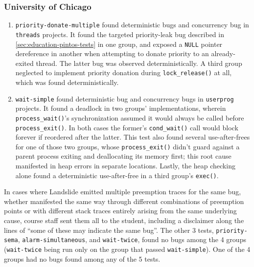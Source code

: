 \subsubsection{University of Chicago}
\label{sec:education-eval-bugs-uc}


\begin{enumerate}
	\item {\tt priority-donate-multiple} found 
		deterministic bugs and  concurrency bug in {\tt threads} projects.
		It found the targeted priority-leak bug
		described in \cref{sec:education-pintos-tests} in one group,
		and exposed a {\tt NULL} pointer dereference in another
		when attempting to donate priority to an already-exited thread.
		The latter bug was observed deterministically.
		A third group neglected to implement priority donation during {\tt lock\_release()} at all,
		which was found deterministically.
	\item {\tt wait-simple} found  deterministic bug
		and  concurrency bugs in {\tt userprog} projects.
		It found a deadlock in two groups' implementations,
		wherein {\tt process\_\allowbreak{}wait()}'s synchronization assumed
		it would always be called before {\tt process\_exit()}.
		In both cases the former's {\tt cond\_wait()} call would block forever if reordered after the latter.
		This test also found several use-after-frees for one of those two groups,
		whose {\tt process\_exit()} didn't guard against a parent process exiting and deallocating its memory first;
		this root cause manifested in heap errors in  separate locations.
		Lastly, the heap checking alone found a deterministic use-after-free in a third group's {\tt exec()}.
\end{enumerate}

In cases where Landslide emitted multiple preemption traces for the same bug,
whether manifested the same way through different combinations of preemption points
or with different stack traces entirely arising from the same underlying cause,
course staff sent them all to the student,
including a disclaimer along the lines of ``some of these may indicate the same bug''.
%
The other 3 tests, {\tt priority-sema}, {\tt alarm-simultaneous}, and {\tt wait-twice},
found no bugs among the 4 groups
({\tt wait-twice} being run only on the group that passed {\tt wait-simple}).
One of the 4 groups had no bugs found among any of the 5 tests.

